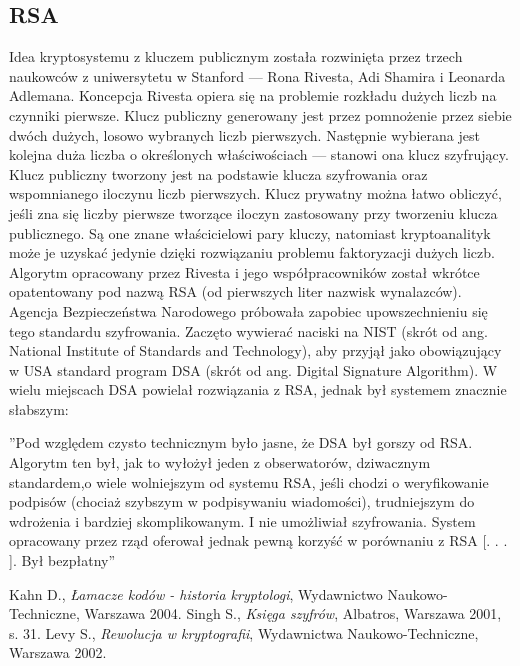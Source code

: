 \documentclass[10pt, a4paper, titlepage]{article}
\begin{document}
\subsection{RSA}
Idea kryptosystemu z kluczem publicznym została rozwinięta przez trzech naukowców z uniwersytetu w Stanford — Rona Rivesta, Adi Shamira i Leonarda Adlemana. Koncepcja Rivesta opiera się na problemie rozkładu dużych liczb na czynniki pierwsze. Klucz publiczny generowany jest przez pomnożenie przez siebie dwóch dużych, losowo wybranych liczb pierwszych. Następnie wybierana jest kolejna duża liczba o określonych właściwościach — stanowi ona klucz szyfrujący. Klucz publiczny tworzony jest na podstawie klucza szyfrowania oraz wspomnianego iloczynu liczb pierwszych. Klucz prywatny można łatwo obliczyć, jeśli zna się liczby pierwsze tworzące iloczyn zastosowany przy tworzeniu klucza publicznego. Są one znane właścicielowi pary kluczy, natomiast kryptoanalityk może je uzyskać jedynie dzięki rozwiązaniu problemu faktoryzacji dużych liczb. Algorytm opracowany przez Rivesta i jego współpracowników został wkrótce opatentowany pod nazwą RSA (od pierwszych liter nazwisk wynalazców). Agencja Bezpieczeństwa Narodowego próbowała zapobiec upowszechnieniu się tego standardu szyfrowania. Zaczęto wywierać naciski na NIST (skrót od ang. National Institute of Standards and Technology), aby przyjął jako obowiązujący w USA standard program DSA (skrót od ang. Digital Signature Algorithm). W wielu miejscach DSA powielał rozwiązania z RSA, jednak był systemem znacznie słabszym:\\
\begin{center}
”Pod względem czysto technicznym było jasne, że DSA był gorszy od RSA. Algorytm ten był,
jak to wyłożył jeden z obserwatorów, dziwacznym standardem,o wiele wolniejszym od systemu
RSA, jeśli chodzi o weryfikowanie podpisów (chociaż szybszym w podpisywaniu wiadomości),
trudniejszym do wdrożenia i bardziej skomplikowanym. I nie umożliwiał szyfrowania. System
opracowany przez rząd oferował jednak pewną korzyść w porównaniu z RSA [. . . ]. Był
bezpłatny”\cite{[3]}
\end{center}

\begin{thebibliography}{9}
\bibitem{[1]}
Kahn D., 
\textit{Łamacze kodów - historia kryptologi}, 
Wydawnictwo Naukowo-Techniczne, Warszawa 2004.
\bibitem{[2]}
Singh S.,
\textit{Księga szyfrów},
Albatros, Warszawa 2001, s. 31.
\bibitem{[3]}
Levy S.,
\textit{Rewolucja w kryptografii}, Wydawnictwa Naukowo-Techniczne, Warszawa 2002.
\end{thebibliography}
\end{document}

